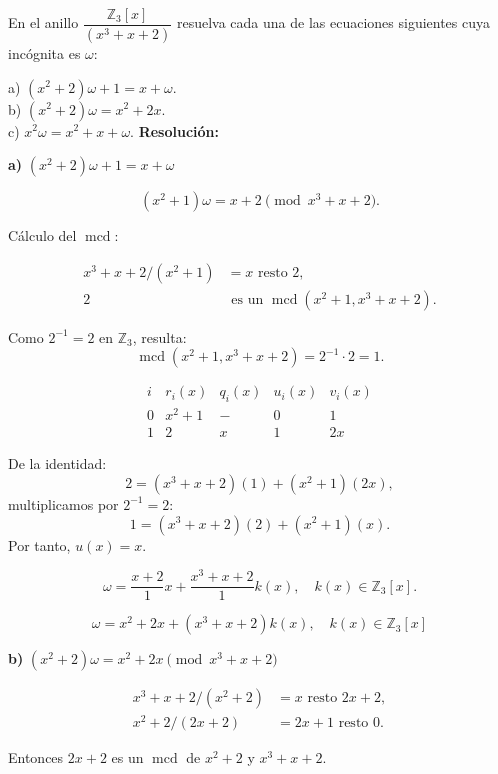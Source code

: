 \documentclass[a4paper,12pt]{article}
\begin{document}
\begin{ejercicio}[title=Ejercicio 59]
En el anillo $\dfrac{\mathbb{Z}_3[x]}{(x^3 + x + 2)}$ resuelva cada una de las ecuaciones siguientes cuya incógnita es $\omega$:

a) $(x^2 + 2)\omega + 1 = x + \omega$.  \\
b) $(x^2 + 2)\omega = x^2 + 2x$.  \\
c) $x^2\omega = x^2 + x + \omega$.
\tcblower
\textbf{Resolución:}

\textbf{a)} $(x^2 + 2)\omega + 1 = x + \omega$

\[
(x^2 + 1)\omega = x + 2 \pmod{x^3 + x + 2}.
\]

Cálculo del $\operatorname{mcd}$:

\[
\begin{aligned}
x^3 + x + 2 / (x^2 + 1) &= x \text{ resto } \boxed{2}, \\
2 &\text{ es un } \operatorname{mcd}(x^2 + 1, x^3 + x + 2).
\end{aligned}
\]

Como $2^{-1} = 2$ en $\mathbb{Z}_3$, resulta:
\[
\operatorname{mcd}(x^2 + 1, x^3 + x + 2) = 2^{-1}\!\cdot 2 = 1.
\]

\[
\begin{array}{c|c|c|c|c}
i & r_i(x) & q_i(x) & u_i(x) & v_i(x) \\ \hline
0 & x^2 + 1 & - & 0 & 1 \\
1 & \boxed{2} & x & 1 & 2x
\end{array}
\]

De la identidad:
\[
\boxed{2} = (x^3 + x + 2)(1) + (x^2 + 1)(2x),
\]
multiplicamos por $2^{-1} = 2$:
\[
1 = (x^3 + x + 2)(2) + (x^2 + 1)(x).
\]
Por tanto, $u(x) = x$.

\[
\omega = \frac{x + 2}{1}x + \frac{x^3 + x + 2}{1}k(x), \quad k(x) \in \mathbb{Z}_3[x].
\]

\[
\boxed{\omega = x^2 + 2x + (x^3 + x + 2)k(x), \quad k(x) \in \mathbb{Z}_3[x]}
\]

\vspace{0.5em}

\textbf{b)} $(x^2 + 2)\omega = x^2 + 2x \pmod{x^3 + x + 2}$

\[
\begin{aligned}
x^3 + x + 2 / (x^2 + 2) &= x \text{ resto } \boxed{2x + 2}, \\
x^2 + 2 / (2x + 2) &= 2x + 1 \text{ resto } 0.
\end{aligned}
\]

Entonces $2x + 2$ es un $\operatorname{mcd}$ de $x^2 + 2$ y $x^3 + x + 2$.  


\end{ejercicio}
\end{document}
